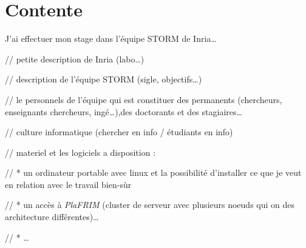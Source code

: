 \section{Contente}

J'ai effectuer mon stage dans l'équipe STORM de Inria\dots

// petite description de Inria (labo\dots)

// description de l'équipe STORM (sigle, objectifs\dots)

// le personnels de l'équipe qui est constituer des permanents (chercheurs, enseignants
chercheurs, ingé\dots),des doctorants et des stagiaires\dots

// culture informatique (chercher en info / étudiants en info)

// materiel et les logiciels a disposition :

// * un ordinateur portable avec linux et la possibilité d'installer ce que je veut
en relation avec le travail bien-sùr

// * un accès à \emph{PlaFRIM} (cluster de serveur avec plusieurs noeuds qui on des
architecture différentes)\dots

// * \dots
